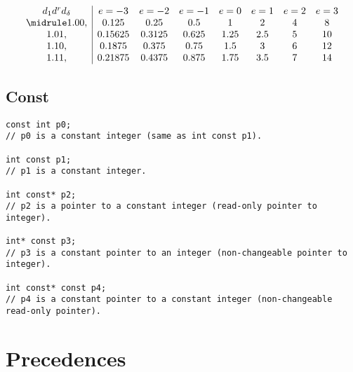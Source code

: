 \[
\begin{array}{c|ccccccc}
d_{1}d^{r}d_{\delta} & e = -3 & e = -2 & e = -1 & e = 0 & e = 1 & e = 2 & e = 3 \\
\midrule
1.00, & 0.125 & 0.25 & 0.5 & 1 & 2 & 4 & 8 \\
1.01, & 0.15625 & 0.3125 & 0.625 & 1.25 & 2.5 & 5 & 10 \\
1.10, & 0.1875 & 0.375 & 0.75 & 1.5 & 3 & 6 & 12 \\
1.11, & 0.21875 & 0.4375 & 0.875 & 1.75 & 3.5 & 7 & 14 \\
\end{array}
\]


\subsection{Const}
\begin{lstlisting}[style=codeexpert]
const int p0;
// p0 is a constant integer (same as int const p1).

int const p1;
// p1 is a constant integer.

int const* p2;
// p2 is a pointer to a constant integer (read-only pointer to integer).

int* const p3;
// p3 is a constant pointer to an integer (non-changeable pointer to integer).

int const* const p4;
// p4 is a constant pointer to a constant integer (non-changeable read-only pointer).
\end{lstlisting}



\section{Precedences}


